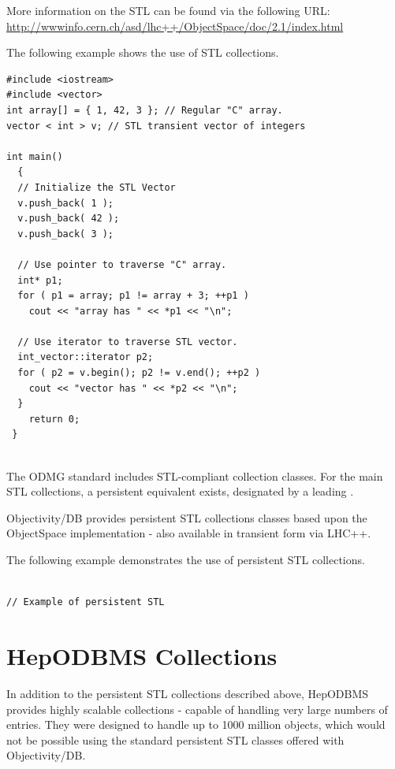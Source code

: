 \par

More information on the STL can be found via the following URL:
\url{http://wwwinfo.cern.ch/asd/lhc++/ObjectSpace/doc/2.1/index.html}
\par

The following example shows the use of STL collections.
\begin{verbatim}
#include <iostream> 
#include <vector> 
int array[] = { 1, 42, 3 }; // Regular "C" array. 
vector < int > v; // STL transient vector of integers 

int main() 
  { 
  // Initialize the STL Vector 
  v.push_back( 1 ); 
  v.push_back( 42 ); 
  v.push_back( 3 ); 

  // Use pointer to traverse "C" array. 
  int* p1; 
  for ( p1 = array; p1 != array + 3; ++p1 ) 
    cout << "array has " << *p1 << "\n"; 

  // Use iterator to traverse STL vector. 
  int_vector::iterator p2; 
  for ( p2 = v.begin(); p2 != v.end(); ++p2 ) 
    cout << "vector has " << *p2 << "\n"; 
  } 
    return 0; 
 } 
 
\end{verbatim}

\par

The ODMG standard includes STL-compliant collection classes. For
the main STL collections, a persistent equivalent exists, designated
by a leading .

\par

Objectivity/DB provides persistent STL collections classes based upon the 
ObjectSpace implementation - also available in transient form
via LHC++.
\par

The following example demonstrates the use of persistent STL collections.
\begin{verbatim}

// Example of persistent STL

\end{verbatim}
\section{HepODBMS Collections}

\par

In addition to the persistent STL collections described above,
HepODBMS provides highly scalable collections - capable of handling
very large numbers of entries. They were designed to handle up to
1000 million objects, which would not be possible using the
standard persistent STL classes offered with Objectivity/DB.

